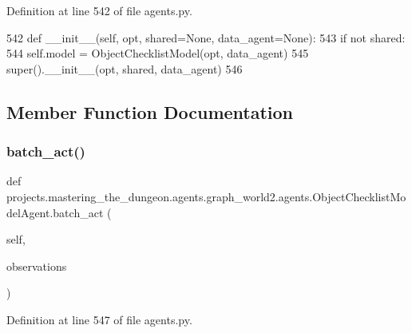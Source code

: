 Definition at line 542 of file agents.\+py.


\begin{DoxyCode}
542     \textcolor{keyword}{def }\_\_init\_\_(self, opt, shared=None, data\_agent=None):
543         \textcolor{keywordflow}{if} \textcolor{keywordflow}{not} shared:
544             self.model = ObjectChecklistModel(opt, data\_agent)
545         super().\_\_init\_\_(opt, shared, data\_agent)
546 
\end{DoxyCode}


\subsection{Member Function Documentation}
\mbox{\label{classprojects_1_1mastering__the__dungeon_1_1agents_1_1graph__world2_1_1agents_1_1ObjectChecklistModelAgent_ac00137901ca02a46981f5f336118cc57}} 
\subsubsection{\texorpdfstring{batch\+\_\+act()}{batch\_act()}}
{\footnotesize\ttfamily def projects.\+mastering\+\_\+the\+\_\+dungeon.\+agents.\+graph\+\_\+world2.\+agents.\+Object\+Checklist\+Model\+Agent.\+batch\+\_\+act (\begin{DoxyParamCaption}\item[{}]{self,  }\item[{}]{observations }\end{DoxyParamCaption})}



Definition at line 547 of file agents.\+py.


